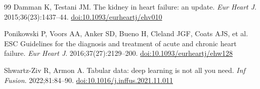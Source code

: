 \documentclass[12pt, a4paper]{article}
\begin{document}
\begin{thebibliography}{99}
Damman K, Testani JM.
\newblock The kidney in heart failure: an update.
\newblock \emph{Eur Heart J}. 2015;36(23):1437--44.
\newblock \href{https://doi.org/10.1093/eurheartj/ehv010}{doi:10.1093/eurheartj/ehv010}

Ponikowski P, Voors AA, Anker SD, Bueno H, Cleland JGF, Coats AJS, et al.
 {ESC} Guidelines for the diagnosis and treatment of acute and
  chronic heart failure.
\newblock \emph{Eur Heart J}. 2016;37(27):2129--200.
\newblock \href{https://doi.org/10.1093/eurheartj/ehw128}{doi:10.1093/eurheartj/ehw128}

Shwartz-Ziv R, Armon A.
\newblock Tabular data: deep learning is not all you need.
\newblock \emph{Inf Fusion}. 2022;81:84--90.
\newblock \href{https://doi.org/10.1016/j.inffus.2021.11.011}{doi:10.1016/j.inffus.2021.11.011}

\end{thebibliography}
\end{document}
